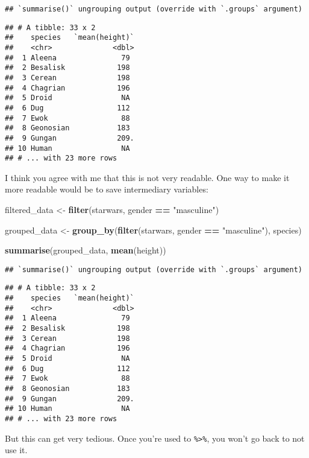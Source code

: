 \documentclass[
]{article}
\newenvironment{Shaded}{\begin{snugshade}}{\end{snugshade}}
\newcommand{\KeywordTok}[1]{\textcolor[rgb]{0.13,0.29,0.53}{\textbf{#1}}}
\newcommand{\NormalTok}[1]{#1}
\newcommand{\OperatorTok}[1]{\textcolor[rgb]{0.81,0.36,0.00}{\textbf{#1}}}
\newcommand{\StringTok}[1]{\textcolor[rgb]{0.31,0.60,0.02}{#1}}
\begin{document}
\begin{verbatim}
## `summarise()` ungrouping output (override with `.groups` argument)
\end{verbatim}

\begin{verbatim}
## # A tibble: 33 x 2
##    species   `mean(height)`
##    <chr>              <dbl>
##  1 Aleena               79 
##  2 Besalisk            198 
##  3 Cerean              198 
##  4 Chagrian            196 
##  5 Droid                NA 
##  6 Dug                 112 
##  7 Ewok                 88 
##  8 Geonosian           183 
##  9 Gungan              209.
## 10 Human                NA 
## # ... with 23 more rows
\end{verbatim}

I think you agree with me that this is not very readable. One way to make it more readable would
be to save intermediary variables:

\begin{Shaded}
\begin{Highlighting}[]
\NormalTok{filtered\_data \textless{}{-}}\StringTok{ }\KeywordTok{filter}\NormalTok{(starwars, gender }\OperatorTok{==}\StringTok{ "masculine"}\NormalTok{)}

\NormalTok{grouped\_data \textless{}{-}}\StringTok{ }\KeywordTok{group\_by}\NormalTok{(}\KeywordTok{filter}\NormalTok{(starwars, gender }\OperatorTok{==}\StringTok{ "masculine"}\NormalTok{), species)}

\KeywordTok{summarise}\NormalTok{(grouped\_data, }\KeywordTok{mean}\NormalTok{(height))}
\end{Highlighting}
\end{Shaded}

\begin{verbatim}
## `summarise()` ungrouping output (override with `.groups` argument)
\end{verbatim}

\begin{verbatim}
## # A tibble: 33 x 2
##    species   `mean(height)`
##    <chr>              <dbl>
##  1 Aleena               79 
##  2 Besalisk            198 
##  3 Cerean              198 
##  4 Chagrian            196 
##  5 Droid                NA 
##  6 Dug                 112 
##  7 Ewok                 88 
##  8 Geonosian           183 
##  9 Gungan              209.
## 10 Human                NA 
## # ... with 23 more rows
\end{verbatim}

But this can get very tedious. Once you're used to \texttt{\%\textgreater{}\%}, you won't go back to not use it.
\end{document}
